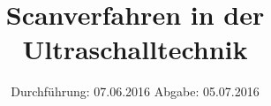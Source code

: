
\subject{US2}
\title{Scanverfahren in der Ultraschalltechnik}
\date{
  Durchführung: 07.06.2016
  \hspace{3em}
  Abgabe: 05.07.2016
}



\maketitle
\newpage
\mbox{}
\newpage
\thispagestyle{empty}
\tableofcontents
\newpage






\nocite{numpy}
\nocite{matplotlib}
\printbibliography


